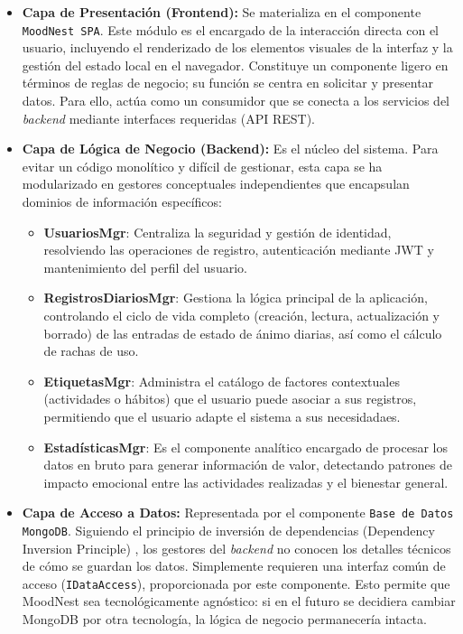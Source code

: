\begin{itemize}
    \item \textbf{Capa de Presentación (Frontend):} Se materializa en el componente \texttt{MoodNest SPA}. Este módulo es el encargado de la interacción directa con el usuario, incluyendo el renderizado de los elementos visuales de la interfaz y la gestión del estado local en el navegador. Constituye un componente ligero en términos de reglas de negocio; su función se centra en solicitar y presentar datos. Para ello, actúa como un consumidor que se conecta a los servicios del \textit{backend} mediante interfaces requeridas (API REST).
    
    \item \textbf{Capa de Lógica de Negocio (Backend):} Es el núcleo del sistema. Para evitar un código monolítico y difícil de gestionar, esta capa se ha modularizado en gestores conceptuales independientes que encapsulan dominios de información específicos:
    \begin{itemize}
        \item \textbf{UsuariosMgr}: Centraliza la seguridad y gestión de identidad, resolviendo las operaciones de registro, autenticación mediante JWT \cite{bib:jwt} y mantenimiento del perfil del usuario.
        \item \textbf{RegistrosDiariosMgr}: Gestiona la lógica principal de la aplicación, controlando el ciclo de vida completo (creación, lectura, actualización y borrado) de las entradas de estado de ánimo diarias, así como el cálculo de rachas de uso.
        \item \textbf{EtiquetasMgr}: Administra el catálogo de factores contextuales (actividades o hábitos) que el usuario puede asociar a sus registros, permitiendo que el usuario adapte el sistema a sus necesidadaes.
        \item \textbf{EstadísticasMgr}: Es el componente analítico encargado de procesar los datos en bruto para generar información de valor, detectando patrones de impacto emocional entre las actividades realizadas y el bienestar general.
    \end{itemize}

    \item \textbf{Capa de Acceso a Datos:} Representada por el componente \texttt{Base de Datos MongoDB}. Siguiendo el principio de inversión de dependencias (Dependency Inversion Principle) \cite{bib:clean_architecture}, los gestores del \textit{backend} no conocen los detalles técnicos de cómo se guardan los datos. Simplemente requieren una interfaz común de acceso (\texttt{IDataAccess}), proporcionada por este componente. Esto permite que MoodNest sea tecnológicamente agnóstico: si en el futuro se decidiera cambiar MongoDB por otra tecnología, la lógica de negocio permanecería intacta.
\end{itemize}

